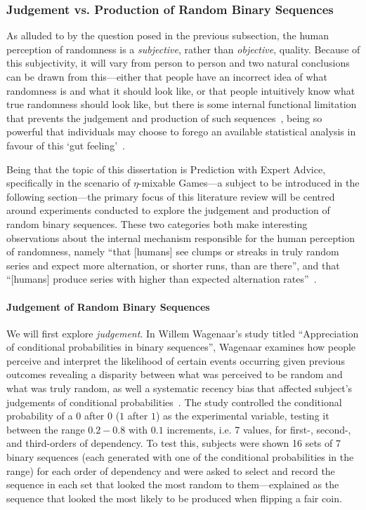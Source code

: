 \subsubsection{Judgement vs. Production of Random Binary Sequences}\label{subsubsection:judgement_vs_subsection:production_of_random_binary_sequences}
As alluded to by the question posed in the previous subsection, the human perception of randomness is a \textit{subjective}, rather than \textit{objective}, quality. Because of this subjectivity, it will vary from person to person and two natural conclusions can be drawn from this—either that people have an incorrect idea of what randomness is and what it should look like, or that people intuitively know what true randomness should look like, but there is some internal functional limitation that prevents the judgement and production of such sequences~\cite{wagenaar:1970}, being so powerful that individuals may choose to forego an available statistical analysis in favour of this `gut feeling'~\cite{bar-hillel:1991}.

Being that the topic of this dissertation is Prediction with Expert Advice, specifically in the scenario of $\eta$-mixable Games—a subject to be introduced in the following section—the primary focus of this literature review will be centred around experiments conducted to explore the judgement and production of random binary sequences. These two categories both make interesting observations about the internal mechanism responsible for the human perception of randomness, namely ``that [humans] see clumps or streaks in truly random series and expect more alternation, or shorter runs, than are there'', and that ``[humans] produce series with higher than expected alternation rates''~\cite{bar-hillel:1991}.

\paragraph{Judgement of Random Binary Sequences}\label{paragraph:judgement_of_random_binary_sequences}
We will first explore \textit{judgement}. In Willem Wagenaar's study titled ``Appreciation of conditional probabilities in binary sequences'', Wagenaar examines how people perceive and interpret the likelihood of certain events occurring given previous outcomes revealing a disparity between what was perceived to be random and what was truly random, as well a systematic recency bias that affected subject's judgements of conditional probabilities~\cite{wagenaar:1970}. The study controlled the conditional probability of a $0$ after $0$ ($1$ after $1$) as the experimental variable, testing it between the range $0.2-0.8$ with $0.1$ increments, i.e. 7 values, for first-, second-, and third-orders of dependency. To test this, subjects were shown 16 sets of 7 binary sequences (each generated with one of the conditional probabilities in the range) for each order of dependency and were asked to select and record the sequence in each set that looked the most random to them—explained as the sequence that looked the most likely to be produced when flipping a fair coin.

